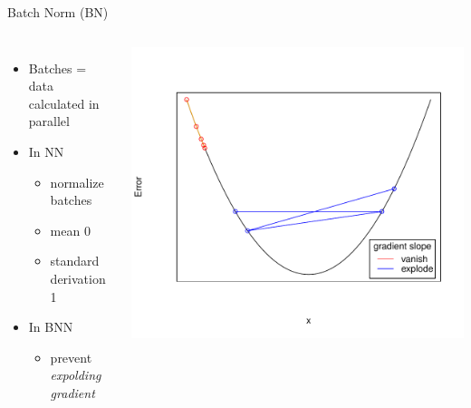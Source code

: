\documentclass[aspectratio=1610, 12pt]{beamer}
\begin{document}
\begin{frame}{Batch Norm (BN)}
\begin{columns}

\begin{itemize}
	\item Batches = data calculated in parallel
	\item In NN
	\begin{itemize}
		\item normalize batches
		\item mean 0
		\item standard derivation 1
	\end{itemize}
	\item In BNN
	\begin{itemize}
		\item prevent \textit{expolding gradient}
	\end{itemize}
\end{itemize}
\centering
\vspace*{-1cm}\includegraphics[scale=0.5]{images/gradient_graph.pdf}
\end{columns}
\end{frame}
\end{document}
